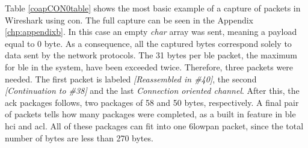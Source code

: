 \noindent Table \ref{coapCON0table} shows the most basic example of a capture of packets in Wireshark using \gls{con}. The full capture can be seen in the Appendix \ref{chp:appendixb}. In this case an empty \textit{char} array was sent, meaning a \gls{payload} equal to 0 byte. As a consequence, all the captured bytes correspond solely to data sent by the network protocols. The 31 bytes per \gls{ble} packet, the maximum for \gls{ble} in the system, have been exceeded twice. Therefore, three packets were needed. The first packet is labeled \textit{[Reassembled in \#40]}, the second \textit{[Continuation to \#38]} and the last \textit{Connection oriented channel}. After this, the \gls{ack} packages follows, two packages of 58 and 50 bytes, respectively. A final pair of packets tells how many packages were completed, as a built in feature in \gls{ble}  \gls{hci}  and \gls{acl}. All of these packages can fit into one \gls{6lowpan} packet, since the total number of bytes are less than 270 bytes. 



